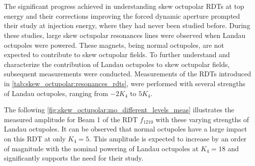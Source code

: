 \FloatBarrier
\section{}



The significant progress achieved in understanding skew octupolar RDTs at top energy and their
corrections improving the forced dynamic aperture prompted their study at injection energy, where they had
never been studied before. During these studies, large skew octupolar resonances lines were observed
when Landau octupoles were powered. These magnets, being normal octupoles, are not expected to
contribute to skew octupolar fields. To further understand and characterize the contribution of
Landau octupoles to skew octupolar fields, subsequent measurements were conducted. Measurements of
the RDTs introduced in \cref{tab:skew_octupolar:resonances_rdts}, were performed with several
strengths of Landau octupoles, ranging from $-2 K_4$ to $5 K_4$.

The following \cref{fig:skew_octupolar:mo_different_levels_meas} illustrates the measured amplitude
for Beam 1 of the RDT $f_{1210}$ with these varying strengths of Landau octupoles. It can be
observed that normal octupoles have a large impact on this RDT at only $K_4 = 5$. This amplitude is
expected to increase by an order of magnitude with the nominal powering of Landau octupoles at
$K_4 = 18$ and significantly supports the need for their study.


